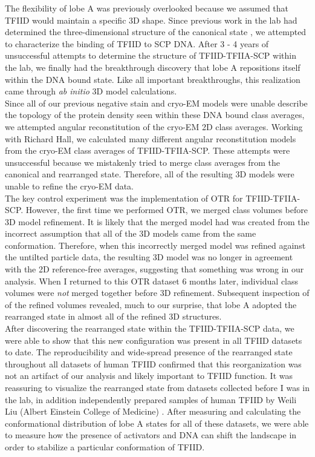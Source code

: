 \indent The flexibility of lobe A was previously overlooked because we assumed that TFIID would maintain a specific 3D shape. Since previous work in the lab had determined the three-dimensional structure of the canonical state \cite{Grob_1281,Liu_723,Liu_574}, we attempted to characterize the binding of TFIID to SCP DNA. After 3 - 4 years of unsuccessful attempts to determine the structure of TFIID-TFIIA-SCP within the lab, we finally had the breakthrough discovery that lobe A repositions itself within the DNA bound state. Like all important breakthroughs, this realization came through \emph{ab initio} 3D model calculations. \\
\indent Since all of our previous negative stain and cryo-EM models were unable describe the topology of the protein density seen within these DNA bound class averages, we attempted angular reconstitution of the cryo-EM 2D class averages. Working with Richard Hall, we calculated many different angular reconstitution models from the cryo-EM class averages of TFIID-TFIIA-SCP. These attempts were unsuccessful because we mistakenly tried to merge class averages from the canonical and rearranged state. Therefore, all of the resulting 3D models were unable to refine the cryo-EM data. \\
\indent The key control experiment was the implementation of OTR for TFIID-TFIIA-SCP. However, the first time we performed OTR, we merged class volumes before 3D model refinement. It is likely that the merged model had was created from the incorrect assumption that all of the 3D models came from the same conformation. Therefore, when this incorrectly merged model was refined against the untilted particle data, the resulting 3D model was no longer in agreement with the 2D reference-free averages, suggesting that something was wrong in our analysis. When I returned to this OTR dataset 6 months later, individual class volumes were \emph{not} merged together before 3D refinement.  Subsequent inspection of of the refined volumes revealed, much to our surprise, that lobe A adopted the rearranged state in almost all of the refined 3D structures. \\
\indent After discovering the rearranged state within the TFIID-TFIIA-SCP data, we were able to show that this new configuration was present in all TFIID datasets to date. The reproducibility and wide-spread presence of the rearranged state throughout all datasets of human TFIID confirmed that this reorganization was not an artifact of our analysis and likely important to TFIID function. It was reassuring to visualize the rearranged state from datasets collected before I was in the lab, in addition independently prepared samples of human TFIID by Weili Liu (Albert Einstein College of Medicine) \cite{Liu_723,Liu_574}. After measuring and calculating the conformational distribution of lobe A states for all of these datasets, we were able to measure how the presence of activators and DNA can shift the landscape in order to stabilize a particular conformation of TFIID.\\

